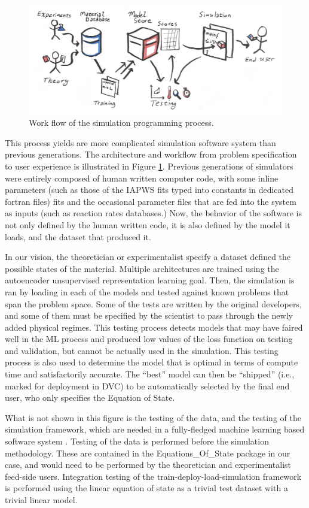 \documentclass[AMA,STIX1COL]{WileyNJD-v2}
\begin{document}
\begin{figure}
  \centering
  \includegraphics[width=6in]{../slides/user_workflow.png}
  \caption{\label{fig:workflow}Work flow of the simulation programming process.}
\end{figure}
This process yields are more complicated simulation software system
than previous generations. The architecture and workflow from problem
specification to user experience is illustrated in Figure
\ref{fig:workflow}.
Previous generations of simulators were entirely composed of human
written computer code, with some inline parameters (such as those of
the IAPWS fits typed into constants in dedicated fortran files)
fits and the occasional parameter files that are fed into the system
as inputs (such as reaction rates databases.)
Now, the behavior of the software is not only defined by the human
written code, it is also defined by the model it loads, and the
dataset that produced it.

In our vision, the theoretician or experimentalist specify a dataset
defined the possible states of the material. Multiple architectures
are trained using the autoencoder unsupervised representation learning
goal. Then, the simulation is ran by loading in each of the models and tested against known problems that
span the problem space. Some of the tests are written by the original
developers, and some of them must be specified by the scientist to
pass through the newly added physical regimes.
This testing process detects models that may have faired well in the
ML process and produced low values of the loss function on testing and
validation, but cannot be actually used in the simulation.
This testing process is also used to determine the model that is
optimal in terms of compute time and satisfactorily accurate.
The ``best'' model can then be ``shipped'' (i.e., marked for
deployment in DVC) to be automatically selected by the final end user,
who only specifies the Equation of State.

What is not shown in this figure is the testing of the data, and the
testing of the simulation framework, which are needed in a
fully-fledged machine learning based software system \cite{google ML smells}.
Testing of the data is performed before the simulation
methodology. These are contained in the Equations\_Of\_State package in our case, and would
need to be performed by the theoretician and experimentalist feed-side
users.
Integration testing of the train-deploy-load-simulation framework is
performed using the linear equation of state as a trivial test dataset
with a trivial linear model. 
\end{document}
